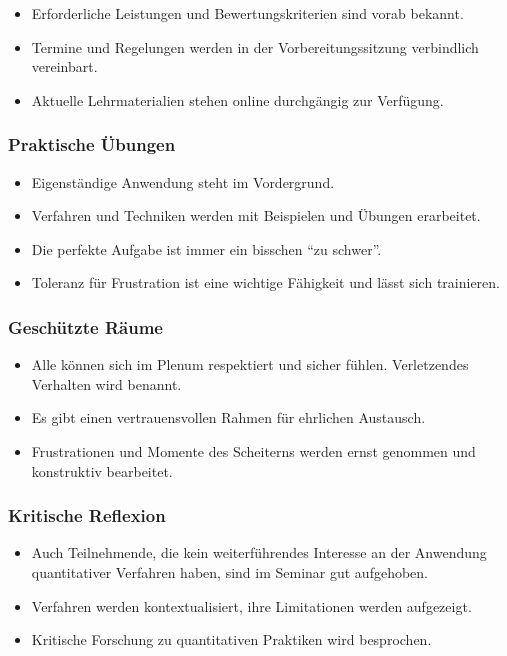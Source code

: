 \documentclass[
  ngerman,
]{article}
\providecommand{\tightlist}{%
  \setlength{\itemsep}{0pt}\setlength{\parskip}{0pt}}
\begin{document}
\begin{itemize}
\tightlist
\item
  Erforderliche Leistungen und Bewertungskriterien sind vorab bekannt.
\item
  Termine und Regelungen werden in der Vorbereitungssitzung verbindlich vereinbart.
\item
  Aktuelle Lehrmaterialien stehen online durchgängig zur Verfügung.
\end{itemize}

\hypertarget{praktische-uxfcbungen}{%
\subsubsection{Praktische Übungen}\label{praktische-uxfcbungen}}

\begin{itemize}
\tightlist
\item
  Eigenständige Anwendung steht im Vordergrund.
\item
  Verfahren und Techniken werden mit Beispielen und Übungen erarbeitet.
\item
  Die perfekte Aufgabe ist immer ein bisschen ``zu schwer''.
\item
  Toleranz für Frustration ist eine wichtige Fähigkeit und lässt sich trainieren.
\end{itemize}

\hypertarget{geschuxfctzte-ruxe4ume}{%
\subsubsection{Geschützte Räume}\label{geschuxfctzte-ruxe4ume}}

\begin{itemize}
\tightlist
\item
  Alle können sich im Plenum respektiert und sicher fühlen. Verletzendes Verhalten wird benannt.
\item
  Es gibt einen vertrauensvollen Rahmen für ehrlichen Austausch.
\item
  Frustrationen und Momente des Scheiterns werden ernst genommen und konstruktiv bearbeitet.
\end{itemize}

\hypertarget{kritische-reflexion}{%
\subsubsection{Kritische Reflexion}\label{kritische-reflexion}}

\begin{itemize}
\tightlist
\item
  Auch Teilnehmende, die kein weiterführendes Interesse an der Anwendung quantitativer Verfahren haben, sind im Seminar gut aufgehoben.
\item
  Verfahren werden kontextualisiert, ihre Limitationen werden aufgezeigt.
\item
  Kritische Forschung zu quantitativen Praktiken wird besprochen.
\end{itemize}
\end{document}
